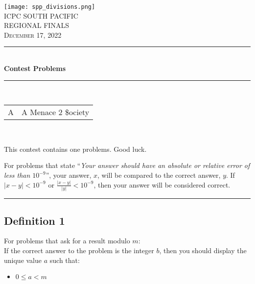 \documentclass[noproblemids,a4paper]{problemset}
\newcommand{\HRule}{\rule{\linewidth}{0.5mm}}
\begin{document}
\normalsize


\thispagestyle{empty}
\begin{center}
\vspace*{\fill}
\texttt{[image: spp\_divisions.png]} \\

\textsc{\Huge ICPC SOUTH PACIFIC \\[0.3cm] REGIONAL FINALS}\\[0.5cm]

\textsc{\Large December 17, 2022}\\[0.3cm]

\HRule \\[0.3cm]

{ \huge \bfseries Contest Problems \\[0.3cm] }

\HRule \\[0.5cm]

{\large
\begin{tabular}{l@{:\hskip4pt}l}
A&A Menace 2 \$ociety\\
\end{tabular}
}
\vspace*{\fill}
\end{center}

\clearpage

~
\vskip 40pt

\begin{center}
This contest contains one problems. Good luck.
\end{center}

\vskip 20pt
For problems that state ``\textit{Your answer should have an absolute or relative error of less than $10^{-9}$}'', your answer, $x$, will be compared to the correct answer, $y$. If $|x-y| < 10^{-9}$ or $\frac{|x-y|}{|y|} < 10^{-9}$, then your answer will be considered correct.


\vskip 20pt
\hrule
\vskip 20pt

\subsection*{Definition 1}

For problems that ask for a result modulo $m$: \\ If the correct answer to the problem is the integer $b$, then you should display the unique value $a$ such that:


\begin{itemize}
\item $0 \leq a < m$
\end{itemize}
\end{document}
